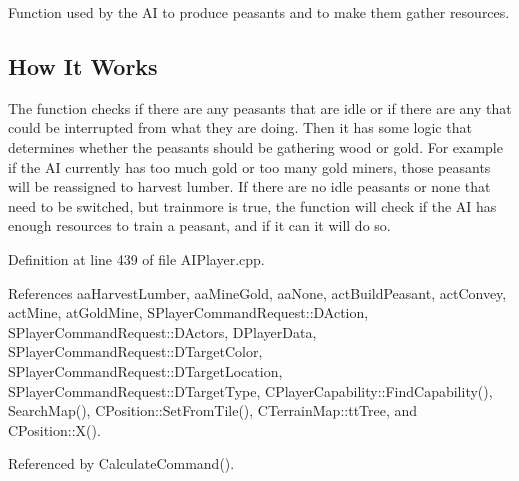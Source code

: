 Function used by the AI to produce peasants and to make them gather resources. 

\hypertarget{classCAIPlayer_aphow_sec}{}\subsection{How It Works}\label{classCAIPlayer_aphow_sec}
The function checks if there are any peasants that are idle or if there are any that could be interrupted from what they are doing. Then it has some logic that determines whether the peasants should be gathering wood or gold. For example if the AI currently has too much gold or too many gold miners, those peasants will be reassigned to harvest lumber. If there are no idle peasants or none that need to be switched, but trainmore is true, the function will check if the AI has enough resources to train a peasant, and if it can it will do so. 

Definition at line 439 of file A\+I\+Player.\+cpp.



References aa\+Harvest\+Lumber, aa\+Mine\+Gold, aa\+None, act\+Build\+Peasant, act\+Convey, act\+Mine, at\+Gold\+Mine, S\+Player\+Command\+Request\+::\+D\+Action, S\+Player\+Command\+Request\+::\+D\+Actors, D\+Player\+Data, S\+Player\+Command\+Request\+::\+D\+Target\+Color, S\+Player\+Command\+Request\+::\+D\+Target\+Location, S\+Player\+Command\+Request\+::\+D\+Target\+Type, C\+Player\+Capability\+::\+Find\+Capability(), Search\+Map(), C\+Position\+::\+Set\+From\+Tile(), C\+Terrain\+Map\+::tt\+Tree, and C\+Position\+::\+X().



Referenced by Calculate\+Command().


